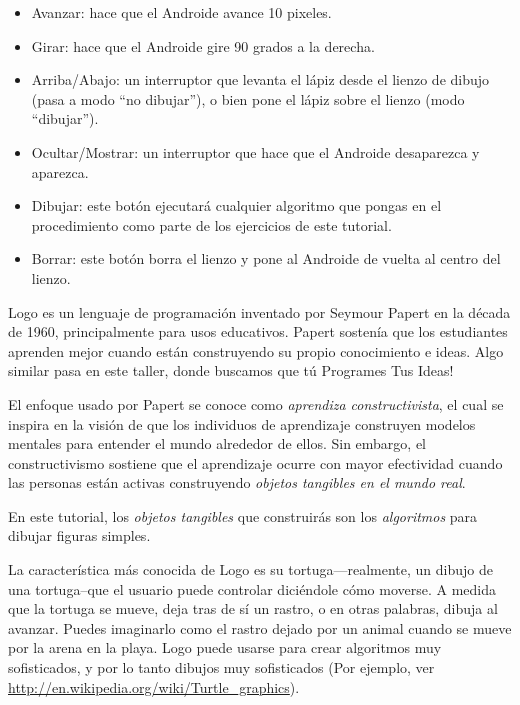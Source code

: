 \begin{itemize}
\item Avanzar: hace que el Androide avance 10 pixeles.

\item Girar: hace que el Androide gire 90 grados a la derecha.

\item Arriba/Abajo: un interruptor que levanta el lápiz desde el
  lienzo de dibujo (pasa a modo ``no dibujar''), o bien pone el lápiz
  sobre el lienzo (modo ``dibujar'').

\item Ocultar/Mostrar: un interruptor que hace que el Androide
  desaparezca y aparezca.

\item Dibujar: este botón ejecutará cualquier algoritmo que pongas en
  el procedimiento  como parte de los ejercicios de
  este tutorial.

\item Borrar: este botón borra el lienzo y pone al Androide de vuelta
  al centro del lienzo.

\end{itemize}

Logo es un lenguaje de programación inventado por Seymour Papert en la
década de 1960, principalmente para usos educativos. Papert sostenía
que los estudiantes aprenden mejor cuando están construyendo su propio
conocimiento e ideas. Algo similar pasa en este taller, donde buscamos
que tú Programes Tus Ideas!

El enfoque usado por Papert se conoce como \emph{aprendiza
  constructivista}, el cual se inspira en la visión de que los
individuos de aprendizaje construyen modelos mentales para entender el
mundo alrededor de ellos. Sin embargo, el constructivismo sostiene que
el aprendizaje ocurre con mayor efectividad cuando las personas están
activas construyendo \emph{objetos tangibles en el mundo real}.

En este tutorial, los \emph{objetos tangibles} que construirás son los
\emph{algoritmos} para dibujar figuras simples.

La característica más conocida de Logo es su tortuga---realmente, un
dibujo de una tortuga--que el usuario puede controlar diciéndole cómo
moverse. A medida que la tortuga se mueve, deja tras de sí un rastro,
o en otras palabras, dibuja al avanzar. Puedes imaginarlo como el
rastro dejado por un animal cuando se mueve por la arena en la
playa. Logo puede usarse para crear algoritmos muy sofisticados, y por
lo tanto dibujos muy sofisticados (Por ejemplo, ver
\url{http://en.wikipedia.org/wiki/Turtle_graphics}).


